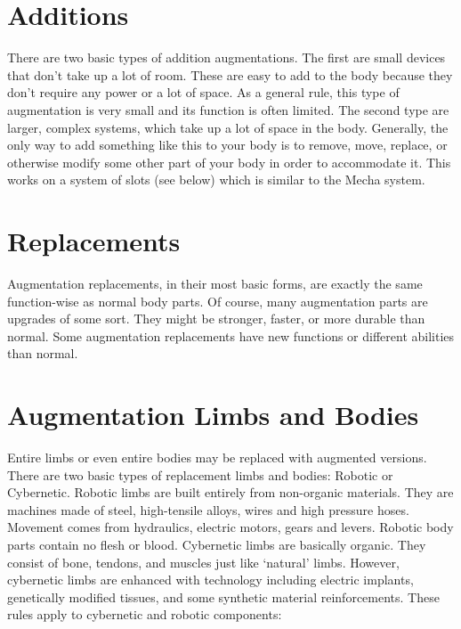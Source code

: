 \documentclass[twoside]{book}
\begin{document}
    

\section{Additions}
     There are two basic types of addition augmentations.
             The first are small devices that don't take up a lot
             of room. These are easy to add to the body because they
             don't require any power or a lot of space. As a
             general rule, this type of augmentation is very small and
             its function is often limited.  The second type are larger, complex systems, which
             take up a lot of space in the body. Generally, the only way
             to add something like this to your body is to remove, move,
             replace, or otherwise modify some other part of your body in
             order to accommodate it. This works on a system of slots
             (see below) which is similar to the Mecha system. 
    

\section{Replacements}
     Augmentation replacements, in their most basic forms,
             are exactly the same function-wise as normal body parts. Of
             course, many augmentation parts are upgrades of some sort.
             They might be stronger, faster, or more durable than normal.
             Some augmentation replacements have new functions or
             different abilities than normal. 
    

\section{Augmentation Limbs and Bodies}
     Entire limbs or even entire bodies may be replaced
             with augmented versions. There are two basic types of
             replacement limbs and bodies: Robotic or Cybernetic.  Robotic limbs are built entirely from non-organic
             materials. They are machines made of steel, high-tensile
             alloys, wires and high pressure hoses. Movement comes from
             hydraulics, electric motors, gears and levers. Robotic body
             parts contain no flesh or blood.  Cybernetic limbs are basically organic. They consist
             of bone, tendons, and muscles just like
             `natural' limbs. However, cybernetic limbs are
             enhanced with technology including electric implants,
             genetically modified tissues, and some synthetic material
             reinforcements.  These rules apply to cybernetic and robotic
             components: 
    
\end{document}
